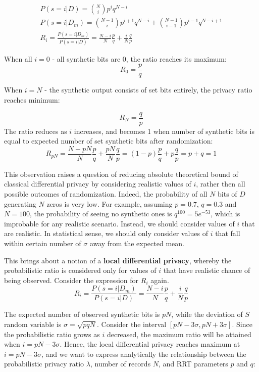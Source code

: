 \documentclass[11pt,draft]{article}
\begin{document}
\begin{align}
P(s=i | D ) = \binom{N}{i}p^iq^{N-i} \\
P(s=i | D_m ) = \binom{N-1}{i}p^{i+1}q^{N-i} +   \binom{N-1}{i-1}p^{i-1}q^{N-i+1}  \\
R_i = \frac{P(s=i | D_m)}{P(s=i | D)} = \frac{N-i}{N}\frac{p}{q} + \frac{i}{N} \frac{q}{p}
\end{align}

When all $i=0$ - all synthetic bits are 0, the ratio reaches its maximum:
\[
R_0 = \frac{p}{q}
\]

When $i=N$ - the synthetic output consists of set bits entirely, the privacy ratio reaches minimum:

\[
R_N = \frac{q}{p}
\]
The ratio reduces as $i$ increases, and becomes 1 when number of synthetic bits is equal to expected number of set synthetic bits after randomization:
\[
R_{pN} =  \frac{N-pN}{N}\frac{p}{q} + \frac{pN}{N} \frac{q}{p} =  (1-p)\frac{p}{q} + p \frac{q}{p} = p + q = 1
\]

This observation raises a question of reducing absolute theoretical bound of classical differential privacy by considering realistic values of $i$, rather then all possible outcomes of randomization.  Indeed, the probability of all $N$ bits of $D$ generating $N$ zeros is very low.  For example, assuming $p=0.7$,  $q=0.3$ and $N=100$,  the probability of seeing no synthetic ones is $q^{100} = 5e^{-53}$, which is improbable for any realistic scenario.  Instead, we should consider values of $i$ that are realistic.  In statistical sense, we should only consider values of $i$ that fall within certain number of $\sigma$ away from the expected mean.  

This brings about a notion of a  \textbf{local differential privacy}, whereby the probabilistic ratio is considered only for values of $i$ that have realistic chance of being observed.  Consider the expression for $R_i$ again.
\[
R_i = \frac{P(s=i | D_m)}{P(s=i | D)} = \frac{N-i}{N}\frac{p}{q} + \frac{i}{N} \frac{q}{p}
\]

The expected number of observed synthetic bits is $pN$, while the deviation of $S$ random variable is $\sigma=\sqrt{pqN}$.  Consider the interval $[pN - 3\sigma,  pN +3\sigma]$. Since the probabilistic ratio grows as $i$ decreased, the maximum ratio will be attained when $i= pN - 3\sigma$.  Hence, the local differential privacy reaches maximum at $i= pN - 3\sigma$, and we want to express analytically the relationship between the probabilistic privacy ratio $\lambda$, number of records $N$, and RRT parameters $p$ and $q$:
\end{document}
